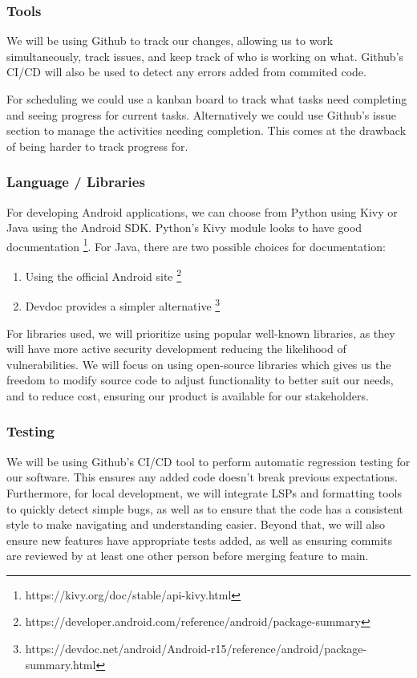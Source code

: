 \subsubsection{Tools}
We will be using Github to track our changes, allowing us to work simultaneously, 
track issues, and keep track of who is working on what. 
Github's CI/CD will also be used to detect any errors added from commited code.
\par
For scheduling we could use a kanban board to track what tasks need completing and seeing
progress for current tasks. Alternatively we could use Github's issue section to manage
the activities needing completion. This comes at the drawback of being harder to track progress
for.
\subsubsection{Language / Libraries}
For developing Android applications, we can choose from Python using Kivy or Java using the Android SDK.
Python's Kivy module looks to have good documentation
\footnote{https://kivy.org/doc/stable/api-kivy.html}.
For Java, there are two possible choices for documentation:
\begin{enumerate}
  \item Using the official Android site
    \footnote{https://developer.android.com/reference/android/package-summary}
  \item Devdoc provides a simpler alternative
    \footnote{https://devdoc.net/android/Android-r15/reference/android/package-summary.html}
\end{enumerate}
\par
For libraries used, we will prioritize using popular well-known libraries, as they will have more
active security development reducing the likelihood of vulnerabilities. We will focus on using
open-source libraries which gives us the freedom to modify source code to adjust functionality to
better suit our needs, and to reduce cost, ensuring our product is available for our stakeholders.
\subsubsection{Testing}
We will be using Github's CI/CD tool to perform automatic regression testing for our software.
This ensures any added code doesn't break previous expectations.
Furthermore, for local development, we will integrate LSPs and formatting tools to quickly detect
simple bugs, as well as to ensure that the code has a consistent style to make navigating and understanding easier.
Beyond that, we will also ensure new features have appropriate tests added, as well as ensuring commits are
reviewed by at least one other person before merging feature to main.
